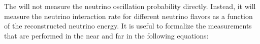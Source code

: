 \label{sec:appx-nd:fluxappendix}

The    will not measure the neutrino oscillation probability directly. Instead, it will measure the neutrino interaction rate for different neutrino flavors as a function of the reconstructed neutrino energy. It is useful to formalize the measurements that are performed in the near and  far  in the following equations:

